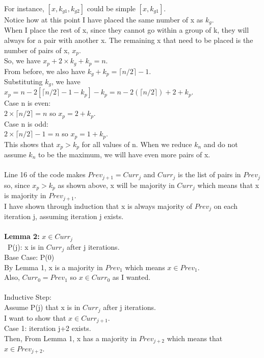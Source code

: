 \documentclass[12pt]{article}
\begin{document}
For instance, $[x, k_{g1}, k_{g2}]$ could be simple $[x, k_{g1}]$.\\
Notice how at this point I have placed the same number of x as $k_g$.\\
When I place the rest of x, since they cannot go within a group of k, they will always for a pair with another x. The remaining x that need to be placed is the number of pairs of x, $x_p$.\\
So, we have $x_p + 2 \times k_g + k_p = n$.\\
From before, we also have $k_g + k_p = \lceil n/2 \rceil - 1$.\\
Substituting $k_g$, we have $x_p = n - 2[\lceil n/2 \rceil - 1 - k_p] - k_p = n - 2(\lceil n/2 \rceil) + 2 + k_p$.\\
Case n is even:\\
$2 \times \lceil n/2 \rceil = n$ so $x_p = 2 + k_p$.\\
Case n is odd:\\
$2 \times \lceil n/2 \rceil - 1 = n$ so $x_p = 1 + k_p$.\\
This shows that $x_p > k_p$ for all values of n. When we reduce $k_n$ and do not assume $k_n$ to be the maximum, we will have even more pairs of x.\\
\\
Line 16 of the code makes $Prev_{j+1} = Curr_j$ and $Curr_j$ is the list of pairs in $Prev_j$ so, since $x_p > k_p$ as shown above, x will be majority in $Curr_j$ which means that x is majority in $Prev_{j+1}$.\\
I have shown through induction that x is always majority of $Prev_j$ on each iteration j, assuming iteration j exists.\\
\\
\textbf{Lemma 2:} $x \in Curr_j$\\\
P(j): x is in $Curr_j$ after j iterations.\\
Base Case: P(0)\\
By Lemma 1, x is a majority in $Prev_1$ which means $x \in Prev_1$.\\
Also, $Curr_0 = Prev_1$ so $x \in Curr_0$ as I wanted.\\
\\
Inductive Step:\\
Assume P(j) that x is in $Curr_j$ after j iterations.\\
I want to show that $x \in Curr_{j+1}$.\\
Case 1: iteration j+2 exists.\\
Then, From Lemma 1, x has a majority in $Prev_{j+2}$ which means that $x \in Prev_{j+2}$.\\
\end{document}
